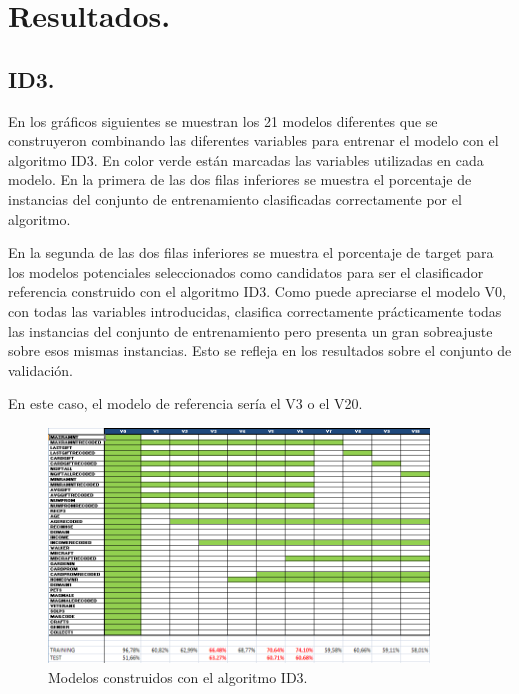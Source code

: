 \section{Resultados.}

\subsection{ID3.}

En los gráficos siguientes se muestran los 21 modelos diferentes que se construyeron combinando las diferentes variables para entrenar el modelo con el algoritmo ID3. En color verde están marcadas las variables utilizadas en cada modelo. En la primera de las dos filas inferiores se muestra el porcentaje de instancias del conjunto de entrenamiento clasificadas correctamente por el algoritmo.

En la segunda de las dos filas inferiores se muestra el porcentaje de target para los modelos potenciales seleccionados como candidatos para ser el clasificador referencia construido con el algoritmo ID3. Como puede apreciarse el modelo V0, con todas las variables introducidas, clasifica correctamente prácticamente todas las instancias del conjunto de entrenamiento pero presenta un gran sobreajuste sobre esos mismas instancias. Esto se refleja en los resultados sobre el conjunto de validación.

En este caso, el modelo de referencia sería el V3 o el V20.

\begin{figure}[H]
\begin{center}
\includegraphics[width=0.9\textwidth]{img/id3-1}
\caption{Modelos construidos con el algoritmo ID3.}
\end{center}
\end{figure}

